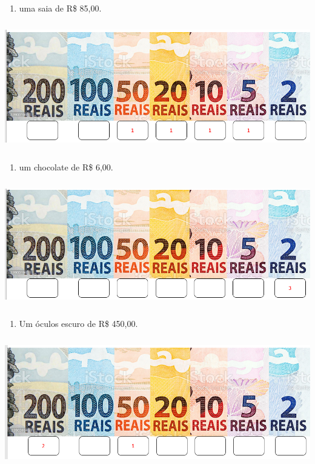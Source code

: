 \begin{enumerate}
\def\labelenumi{\Alph{enumi})}
\item
  uma saia de R\$ 85,00.
\end{enumerate}

\includegraphics[width=5.90556in,height=2.18056in]{media/image68.png}

\begin{enumerate}
\def\labelenumi{\Alph{enumi})}
\item
  um chocolate de R\$ 6,00.
\end{enumerate}

\includegraphics[width=5.90556in,height=2.14583in]{media/image69.png}

\begin{enumerate}
\def\labelenumi{\Alph{enumi})}
\item
  Um óculos escuro de R\$ 450,00.
\end{enumerate}

\includegraphics[width=5.90556in,height=2.19931in]{media/image70.png}

